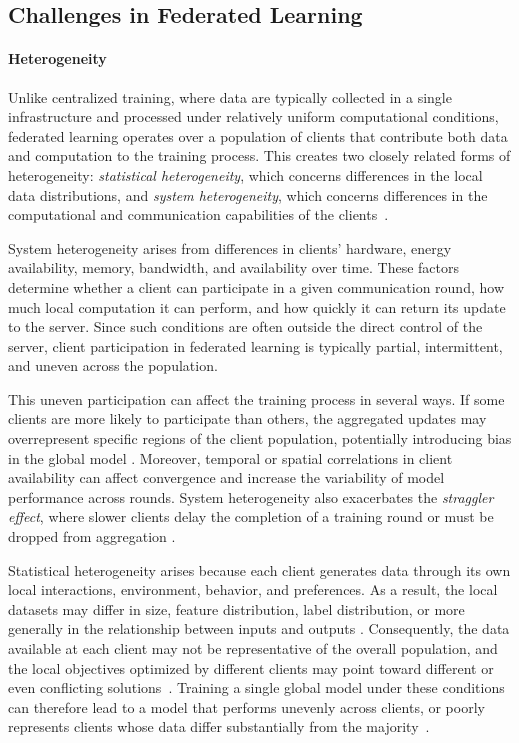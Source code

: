 \subsection{Challenges in Federated Learning}

\paragraph{Heterogeneity}
Unlike centralized training, where data are typically collected in a single infrastructure and processed under relatively uniform computational conditions, federated learning operates over a population of clients that contribute both data and computation to the training process. This creates two closely related forms of heterogeneity: \textit{statistical heterogeneity}, which concerns differences in the local data distributions, and \textit{system heterogeneity}, which concerns differences in the computational and communication capabilities of the clients~\cite{kairouz_open_problems}.


System heterogeneity arises from differences in clients' hardware, energy availability, memory, bandwidth, and availability over time. These factors determine whether a client can participate in a given communication round, how much local computation it can perform, and how quickly it can return its update to the server. Since such conditions are often outside the direct control of the server, client participation in federated learning is typically partial, intermittent, and uneven across the population.

This uneven participation can affect the training process in several ways. If some clients are more likely to participate than others, the aggregated updates may overrepresent specific regions of the client population, potentially introducing bias in the global model \cite{wang_client}. Moreover, temporal or spatial correlations in client availability can affect convergence and increase the variability of model performance across rounds. System heterogeneity also exacerbates the \textit{straggler effect}, where slower clients delay the completion of a training round or must be dropped from aggregation \cite{kairouz_open_problems}.


Statistical heterogeneity arises because each client generates data through its own local interactions, environment, behavior, and preferences. As a result, the local datasets may differ in size, feature distribution, label distribution, or more generally in the relationship between inputs and outputs \cite{kairouz_open_problems, ye_review_het_fl}. Consequently, the data available at each client may not be representative of the overall population, and the local objectives optimized by different clients may point toward different or even conflicting solutions~\cite{scaffold}. Training a single global model under these conditions can therefore lead to a model that performs unevenly across clients, or poorly represents clients whose data differ substantially from the majority~\cite{marfoq2021federated}. 

